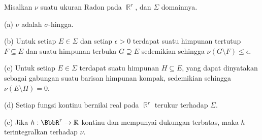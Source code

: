  Misalkan $\nu$ suatu ukuran Radon pada $\BbbR^r$, dan
$\Sigma$ domainnya.

(a) $\nu$ adalah $\sigma$-hingga.

(b) Untuk setiap $E\in\Sigma$ dan setiap
$\epsilon>0$ terdapat suatu himpunan tertutup
$F\subseteq E$ dan suatu himpunan terbuka $G\supseteq E$ sedemikian sehingga
$\nu(G\setminus F)\le\epsilon$.

(c) Untuk setiap $E\in\Sigma$ terdapat suatu himpunan
$H\subseteq E$, yang dapat dinyatakan sebagai gabungan suatu barisan himpunan kompak,
sedemikian sehingga $\nu(E\setminus H)=0$.

(d) Setiap fungsi kontinu bernilai real pada $\BbbR^r$ terukur
terhadap $\Sigma$.

(e) Jika $h:\BbbR^r\to\Bbb R$ kontinu dan mempunyai dukungan terbatas,
maka $h$ terintegralkan terhadap $\nu$.

